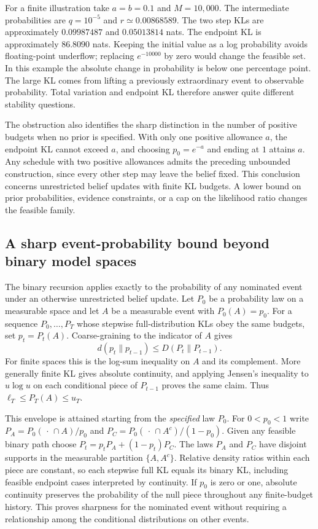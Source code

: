 \documentclass[12pt,letterpaper]{article}
\begin{document}
For a finite illustration take $a=b=0.1$ and $M=10{,}000$. The intermediate probabilities are $q=10^{-5}$ and $r\simeq0.00868589$. The two step KLs are approximately $0.09987487$ and $0.05013814$ nats. The endpoint KL is approximately $86.8090$ nats. Keeping the initial value as a log probability avoids floating-point underflow; replacing $e^{-10000}$ by zero would change the feasible set. In this example the absolute change in probability is below one percentage point. The large KL comes from lifting a previously extraordinary event to observable probability. Total variation and endpoint KL therefore answer quite different stability questions.

The obstruction also identifies the sharp distinction in the number of positive budgets when no prior is specified. With only one positive allowance $a$, the endpoint KL cannot exceed $a$, and choosing $p_0=e^{-a}$ and ending at $1$ attains $a$. Any schedule with two positive allowances admits the preceding unbounded construction, since every other step may leave the belief fixed. This conclusion concerns unrestricted belief updates with finite KL budgets. A lower bound on prior probabilities, evidence constraints, or a cap on the likelihood ratio changes the feasible family.

\subsection{A sharp event-probability bound beyond binary model spaces}

The binary recursion applies exactly to the probability of any nominated event under an otherwise unrestricted belief update. Let $P_0$ be a probability law on a measurable space and let $A$ be a measurable event with $P_0(A)=p_0$. For a sequence $P_0,\ldots,P_T$ whose stepwise full-distribution KLs obey the same budgets, set $p_t=P_t(A)$. Coarse-graining to the indicator of $A$ gives
\[
 d(p_t\|p_{t-1})\leq D(P_t\|P_{t-1}).
\]
For finite spaces this is the log-sum inequality on $A$ and its complement. More generally finite KL gives absolute continuity, and applying Jensen's inequality to $u\log u$ on each conditional piece of $P_{t-1}$ proves the same claim. Thus $\ell_T\leq P_T(A)\leq u_T$.

This envelope is attained starting from the \emph{specified} law $P_0$. For $0<p_0<1$ write $P_A=P_0(\,\cdot\,\cap A)/p_0$ and $P_C=P_0(\,\cdot\,\cap A^c)/(1-p_0)$. Given any feasible binary path choose $P_t=p_tP_A+(1-p_t)P_C$. The laws $P_A$ and $P_C$ have disjoint supports in the measurable partition $\{A,A^c\}$. Relative density ratios within each piece are constant, so each stepwise full KL equals its binary KL, including feasible endpoint cases interpreted by continuity. If $p_0$ is zero or one, absolute continuity preserves the probability of the null piece throughout any finite-budget history. This proves sharpness for the nominated event without requiring a relationship among the conditional distributions on other events.
\end{document}
